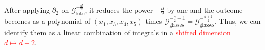 \documentclass[17pt,margin=0.5in,innermargin=-2.5in,blockverticalspace=1cm]{tikzposter}
\begin{document}
\begin{columns}
{\vspace{1cm}

After applying $\partial_2$ on $\mathcal{G}_{\text{kite}}^{-\frac{d}{2}}$, it reduces the power $-\frac{d}{2}$ by one and the outcome becomes as a polynomial of $(x_1, x_3, x_4, x_5)$ times $\mathcal{G}_{\text{glasses}}^{-\frac{d}{2}-1}= \mathcal{G}_{\text{glasses}}^{-\frac{d+2}{2}}$.
Thus, we can identify them as a linear combination of integrals in a \textcolor{red}{shifted dimension $d \mapsto d+2$}.


    
    
    }
    



\end{columns}
\end{document}

